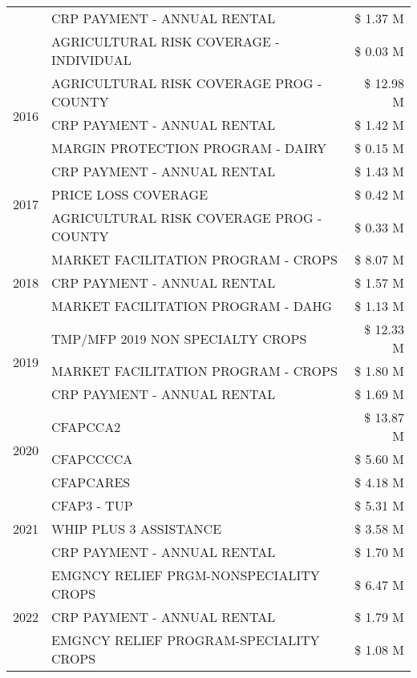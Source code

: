 \begin{tabular}{llr}
 & CRP PAYMENT - ANNUAL RENTAL & \$ 1.37 M \\
 & AGRICULTURAL RISK COVERAGE - INDIVIDUAL & \$ 0.03 M \\
\cline{1-3}
\multirow[t]{3}{*}{2016} & AGRICULTURAL RISK COVERAGE PROG - COUNTY & \$ 12.98 M \\
 & CRP PAYMENT - ANNUAL RENTAL & \$ 1.42 M \\
 & MARGIN PROTECTION PROGRAM - DAIRY & \$ 0.15 M \\
\cline{1-3}
\multirow[t]{3}{*}{2017} & CRP PAYMENT - ANNUAL RENTAL & \$ 1.43 M \\
 & PRICE LOSS COVERAGE & \$ 0.42 M \\
 & AGRICULTURAL RISK COVERAGE PROG - COUNTY & \$ 0.33 M \\
\cline{1-3}
\multirow[t]{3}{*}{2018} & MARKET FACILITATION PROGRAM - CROPS & \$ 8.07 M \\
 & CRP PAYMENT - ANNUAL RENTAL & \$ 1.57 M \\
 & MARKET FACILITATION PROGRAM - DAHG & \$ 1.13 M \\
\cline{1-3}
\multirow[t]{3}{*}{2019} & TMP/MFP 2019 NON SPECIALTY CROPS & \$ 12.33 M \\
 & MARKET FACILITATION PROGRAM - CROPS & \$ 1.80 M \\
 & CRP PAYMENT - ANNUAL RENTAL & \$ 1.69 M \\
\cline{1-3}
\multirow[t]{3}{*}{2020} & CFAPCCA2 & \$ 13.87 M \\
 & CFAPCCCCA & \$ 5.60 M \\
 & CFAPCARES & \$ 4.18 M \\
\cline{1-3}
\multirow[t]{3}{*}{2021} & CFAP3 - TUP & \$ 5.31 M \\
 & WHIP PLUS 3 ASSISTANCE & \$ 3.58 M \\
 & CRP PAYMENT - ANNUAL RENTAL & \$ 1.70 M \\
\cline{1-3}
\multirow[t]{3}{*}{2022} & EMGNCY RELIEF PRGM-NONSPECIALITY CROPS & \$ 6.47 M \\
 & CRP PAYMENT - ANNUAL RENTAL & \$ 1.79 M \\
 & EMGNCY RELIEF PROGRAM-SPECIALITY CROPS & \$ 1.08 M \\
\cline{1-3}
\bottomrule
\end{tabular}
